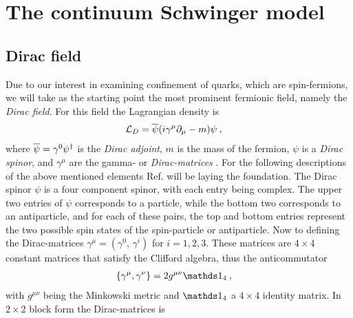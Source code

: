 \documentclass[../main.tex]{subfiles} %
\begin{document}
\section{The continuum Schwinger model} \label{Sec:ContinuumSchwingerModel}




\subsection{Dirac field} \label{sec:DiracField}

Due to our interest in examining confinement of quarks, which are spin-\half fermions, we will take as the starting point the most prominent fermionic field, namely the \emph{Dirac field}. For this field the Lagrangian density is
\begin{align} \label{eq:DiracLagrangiangDensity}
    \mathcal{L}_D &= \overline{\psi} (i \gamma^\mu \partial_\mu - m) \psi \: ,
\end{align}
where $\psibar = \gamma^0 \psi\dagger$ is the \emph{Dirac adjoint}, $m$ is the mass of the fermion, $\psi$ is a \emph{Dirac spinor}, and $\gamma^\mu$ are the gamma- or \emph{Dirac-matrices} \cite{peskin_introToQFT_1995,sakurai_modernQM_2017}. For the following descriptions of the above mentioned elements Ref. \cite{peskin_introToQFT_1995} will be laying the foundation. The Dirac spinor $\psi$ is a four component spinor, with each entry being complex. The upper two entries of $\psi$ corresponds to a particle, while the bottom two corresponds to an antiparticle, and for each of these pairs, the top and bottom entries represent the two possible spin states of the spin-\half particle or antiparticle. Now to defining the Dirac-matrices $\gamma^\mu = (\gamma^0,\, \gamma^i)$ for $i=1,2,3$. These matrices are $4 \times 4$ constant matrices that satisfy the Clifford algebra, thus the anticommutator
\begin{align}
    \anticommutator{\gamma^\mu}{\gamma^\nu} &= 2g^{\mu\nu}\id_4 \: ,
\end{align}
with $g^{\mu\nu}$ being the Minkowski metric and $\id_4$ a $4 \times 4$ identity matrix. In $2 \times 2$ block form the Dirac-matrices is
\end{document}
